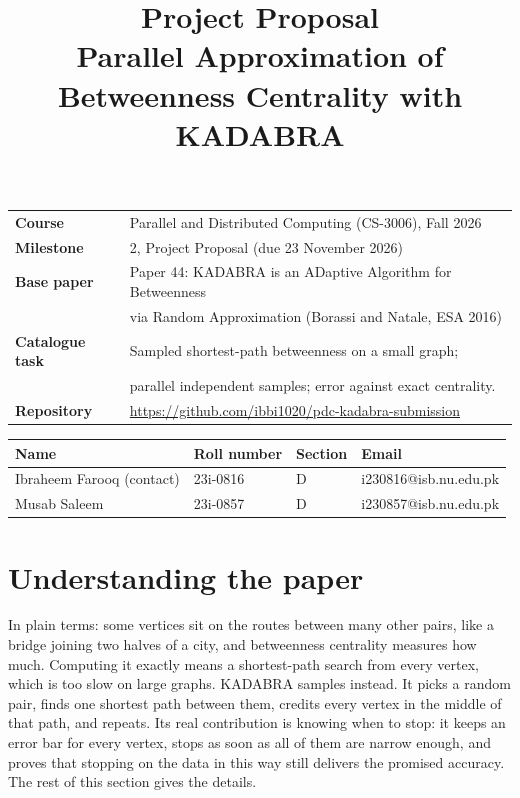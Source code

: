\documentclass[11pt]{article}
\title{\vspace{-2.5em}\textbf{Project Proposal}\\[0.3em]
\large Parallel Approximation of Betweenness Centrality with KADABRA}
\author{}
\date{}
\begin{document}
\maketitle
\vspace{-3em}

\begin{center}
\begin{tabular}{@{}ll@{}}
\textbf{Course} & Parallel and Distributed Computing (CS-3006), Fall 2026 \\
\textbf{Milestone} & 2, Project Proposal (due 23 November 2026) \\
\textbf{Base paper} & Paper 44: KADABRA is an ADaptive Algorithm for Betweenness \\
 & via Random Approximation (Borassi and Natale, ESA 2016) \\
\textbf{Catalogue task} & Sampled shortest-path betweenness on a small graph; \\
 & parallel independent samples; error against exact centrality. \\
\textbf{Repository} & \url{https://github.com/ibbi1020/pdc-kadabra-submission} \\
\end{tabular}
\end{center}

\vspace{0.5em}

\begin{center}
\begin{tabular}{@{}llll@{}}
\toprule
\textbf{Name} & \textbf{Roll number} & \textbf{Section} & \textbf{Email} \\
\midrule
Ibraheem Farooq (contact) & 23i-0816 & D & i230816@isb.nu.edu.pk \\
Musab Saleem & 23i-0857 & D & i230857@isb.nu.edu.pk \\
\bottomrule
\end{tabular}
\end{center}


\section{Understanding the paper}

In plain terms: some vertices sit on the routes between many other pairs, like a bridge joining two halves of a city, and betweenness centrality measures how much. Computing it exactly means a shortest-path search from every vertex, which is too slow on large graphs. KADABRA samples instead. It picks a random pair, finds one shortest path between them, credits every vertex in the middle of that path, and repeats. Its real contribution is knowing when to stop: it keeps an error bar for every vertex, stops as soon as all of them are narrow enough, and proves that stopping on the data in this way still delivers the promised accuracy. The rest of this section gives the details.
\end{document}
